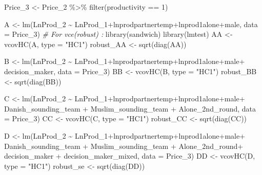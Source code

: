 \documentclass[
]{article}
\newenvironment{Shaded}{\begin{snugshade}}{\end{snugshade}}
\newcommand{\AttributeTok}[1]{\textcolor[rgb]{0.77,0.63,0.00}{#1}}
\newcommand{\CommentTok}[1]{\textcolor[rgb]{0.56,0.35,0.01}{\textit{#1}}}
\newcommand{\DecValTok}[1]{\textcolor[rgb]{0.00,0.00,0.81}{#1}}
\newcommand{\FunctionTok}[1]{\textcolor[rgb]{0.00,0.00,0.00}{#1}}
\newcommand{\NormalTok}[1]{#1}
\newcommand{\OtherTok}[1]{\textcolor[rgb]{0.56,0.35,0.01}{#1}}
\newcommand{\SpecialCharTok}[1]{\textcolor[rgb]{0.00,0.00,0.00}{#1}}
\newcommand{\StringTok}[1]{\textcolor[rgb]{0.31,0.60,0.02}{#1}}
\begin{document}
\begin{Shaded}
\begin{Highlighting}[]
\NormalTok{Price\_3 }\OtherTok{\textless{}{-}}\NormalTok{ Price\_2 }\SpecialCharTok{\%\textgreater{}\%}
  \FunctionTok{filter}\NormalTok{(productivity }\SpecialCharTok{==} \DecValTok{1}\NormalTok{)}

\NormalTok{A }\OtherTok{\textless{}{-}} \FunctionTok{lm}\NormalTok{(LnProd\_2 }\SpecialCharTok{\textasciitilde{}}\NormalTok{ LnProd\_1}\SpecialCharTok{+}\NormalTok{lnprodpartnertemp}\SpecialCharTok{+}\NormalTok{lnprod1alone}\SpecialCharTok{+}\NormalTok{male, }\AttributeTok{data =}\NormalTok{ Price\_3)}
\CommentTok{\# For vce(robust) :}
\FunctionTok{library}\NormalTok{(sandwich)}
\FunctionTok{library}\NormalTok{(lmtest)}
\NormalTok{AA }\OtherTok{\textless{}{-}} \FunctionTok{vcovHC}\NormalTok{(A, }\AttributeTok{type =} \StringTok{"HC1"}\NormalTok{)}
\NormalTok{robust\_AA }\OtherTok{\textless{}{-}} \FunctionTok{sqrt}\NormalTok{(}\FunctionTok{diag}\NormalTok{(AA))}

\NormalTok{B }\OtherTok{\textless{}{-}} \FunctionTok{lm}\NormalTok{(LnProd\_2 }\SpecialCharTok{\textasciitilde{}}\NormalTok{ LnProd\_1}\SpecialCharTok{+}\NormalTok{lnprodpartnertemp}\SpecialCharTok{+}\NormalTok{lnprod1alone}\SpecialCharTok{+}\NormalTok{male}\SpecialCharTok{+}\NormalTok{ decision\_maker,}
        \AttributeTok{data =}\NormalTok{ Price\_3)}
\NormalTok{BB }\OtherTok{\textless{}{-}} \FunctionTok{vcovHC}\NormalTok{(B, }\AttributeTok{type =} \StringTok{"HC1"}\NormalTok{)}
\NormalTok{robust\_BB }\OtherTok{\textless{}{-}} \FunctionTok{sqrt}\NormalTok{(}\FunctionTok{diag}\NormalTok{(BB))}

\NormalTok{C }\OtherTok{\textless{}{-}} \FunctionTok{lm}\NormalTok{(LnProd\_2 }\SpecialCharTok{\textasciitilde{}}\NormalTok{ LnProd\_1}\SpecialCharTok{+}\NormalTok{lnprodpartnertemp}\SpecialCharTok{+}\NormalTok{lnprod1alone}\SpecialCharTok{+}\NormalTok{male}\SpecialCharTok{+} 
\NormalTok{          Danish\_sounding\_team }\SpecialCharTok{+}\NormalTok{ Muslim\_sounding\_team }\SpecialCharTok{+}\NormalTok{ Alone\_2nd\_round, }
        \AttributeTok{data =}\NormalTok{ Price\_3)}
\NormalTok{CC }\OtherTok{\textless{}{-}} \FunctionTok{vcovHC}\NormalTok{(C, }\AttributeTok{type =} \StringTok{"HC1"}\NormalTok{)}
\NormalTok{robust\_CC }\OtherTok{\textless{}{-}} \FunctionTok{sqrt}\NormalTok{(}\FunctionTok{diag}\NormalTok{(CC))}

\NormalTok{D }\OtherTok{\textless{}{-}} \FunctionTok{lm}\NormalTok{(LnProd\_2 }\SpecialCharTok{\textasciitilde{}}\NormalTok{ LnProd\_1}\SpecialCharTok{+}\NormalTok{lnprodpartnertemp}\SpecialCharTok{+}\NormalTok{lnprod1alone}\SpecialCharTok{+}\NormalTok{male}\SpecialCharTok{+} 
\NormalTok{          Danish\_sounding\_team }\SpecialCharTok{+}\NormalTok{ Muslim\_sounding\_team }\SpecialCharTok{+}\NormalTok{ Alone\_2nd\_round}\SpecialCharTok{+} 
\NormalTok{          decision\_maker }\SpecialCharTok{+}\NormalTok{ decision\_maker\_mixed, }\AttributeTok{data =}\NormalTok{ Price\_3)}
\NormalTok{DD }\OtherTok{\textless{}{-}} \FunctionTok{vcovHC}\NormalTok{(D, }\AttributeTok{type =} \StringTok{"HC1"}\NormalTok{)}
\NormalTok{robust\_se }\OtherTok{\textless{}{-}} \FunctionTok{sqrt}\NormalTok{(}\FunctionTok{diag}\NormalTok{(DD))}


\end{Highlighting}
\end{Shaded}
\end{document}
